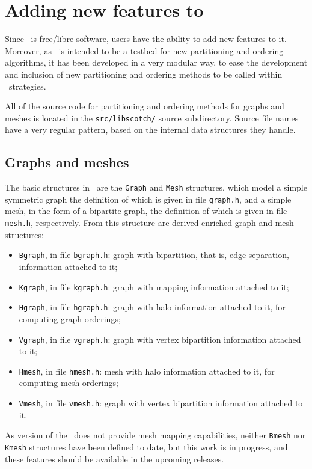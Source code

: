 
\section{Adding new features to \scotch}
\label{sec-coding}

Since \scotch\ is free/libre software, users have the ability
to add new features to it. Moreover, as \scotch\ is intended to be a
testbed for new partitioning and ordering algorithms, it has been
developed in a very modular way, to ease the development and inclusion
of new partitioning and ordering methods to be called within
\scotch\ strategies.

All of the source code for partitioning and ordering methods for
graphs and meshes is located in the {\tt src/\lbt libscotch/} source
subdirectory. Source file names have a very regular pattern, based on
the internal data structures they handle.

\subsection{Graphs and meshes}

The basic structures in \scotch\ are the {\tt Graph} and {\tt Mesh}
structures, which model a simple symmetric graph the definition of
which is given in file {\tt graph.h}, and a simple mesh, in the form
of a bipartite graph, the definition of which is given in file {\tt
mesh.h}, respectively. From this structure are derived enriched graph
and mesh structures:
\begin{itemize}
\item
{\tt Bgraph}, in file {\tt bgraph.h}: graph with bipartition, that is,
edge separation, information attached to it;
\item
{\tt Kgraph}, in file {\tt kgraph.h}: graph with mapping information
attached to it;
\item
{\tt Hgraph}, in file {\tt hgraph.h}: graph with halo information
attached to it, for computing graph orderings;
\item
{\tt Vgraph}, in file {\tt vgraph.h}: graph with vertex bipartition
information attached to it;
\item
{\tt Hmesh}, in file {\tt hmesh.h}: mesh with halo information
attached to it, for computing mesh orderings;
\item
{\tt Vmesh}, in file {\tt vmesh.h}: graph with vertex bipartition
information attached to it.
\end{itemize}
As version {\sc \scotchver} of the \libscotch\ does not provide mesh
mapping capabilities, neither {\tt Bmesh} nor {\tt Kmesh} structures
have been defined to date, but this work is in progress, and these
features should be available in the upcoming releases.

